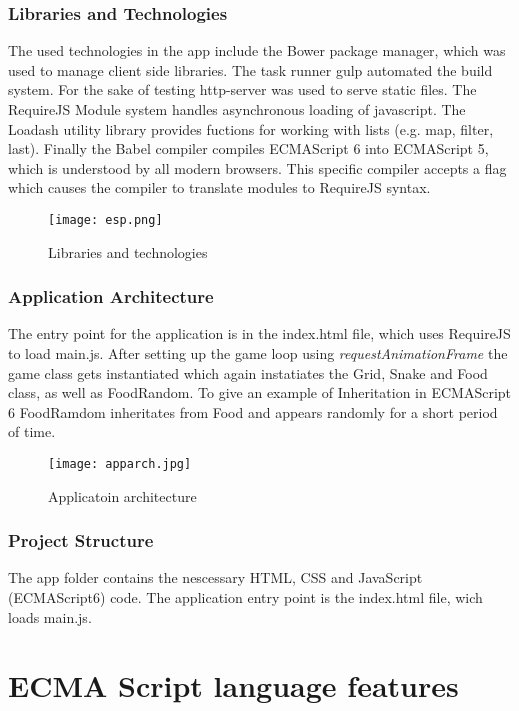 \documentclass{bioinfo}
\begin{document}
\subsubsection{Libraries and Technologies}
The used technologies in the app include the Bower package manager, which was used to manage client side libraries. The task runner gulp automated the build system.
For the sake of testing http-server was used to serve static files. The RequireJS Module system handles asynchronous loading of javascript. The Loadash utility library
provides fuctions for working with lists (e.g. map, filter, last). Finally the Babel compiler compiles ECMAScript 6 into ECMAScript 5, which is understood by all modern browsers.
This specific compiler accepts a flag which causes the compiler to translate modules to RequireJS syntax.

\begin{figure}[!tpb]%
\centerline{\texttt{[image: esp.png]}}
\caption{Libraries and technologies}\label{fig:01}
\end{figure}


\subsubsection{Application Architecture}
The entry point for the application is in the index.html file, which uses RequireJS to load main.js. After setting up the game 
loop using \textit{requestAnimationFrame} the game class gets instantiated which again instatiates the Grid, Snake and Food class,
as well as FoodRandom. To give an example of Inheritation in ECMAScript 6 FoodRamdom inheritates from Food and appears randomly for
a short period of time.
\begin{figure}[!tpb]%
\centerline{\texttt{[image: apparch.jpg]}}
\caption{Applicatoin architecture}\label{fig:02}
\end{figure}
\subsubsection{Project Structure} 
The app folder contains the nescessary HTML, CSS and JavaScript (ECMAScript6) code. The application entry point is the index.html file, wich loads main.js.

\section{ECMA Script language features}
\end{document}

